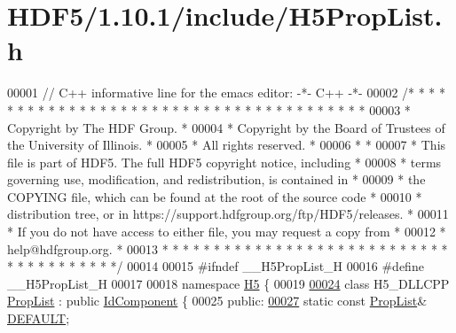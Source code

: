 \hypertarget{_h_d_f5_21_810_81_2include_2_h5_prop_list_8h_source}{}\section{H\+D\+F5/1.10.1/include/\+H5\+Prop\+List.h}
\label{_h_d_f5_21_810_81_2include_2_h5_prop_list_8h_source}

\begin{DoxyCode}
00001 \textcolor{comment}{// C++ informative line for the emacs editor: -*- C++ -*-}
00002 \textcolor{comment}{/* * * * * * * * * * * * * * * * * * * * * * * * * * * * * * * * * * * * * * *}
00003 \textcolor{comment}{ * Copyright by The HDF Group.                                               *}
00004 \textcolor{comment}{ * Copyright by the Board of Trustees of the University of Illinois.         *}
00005 \textcolor{comment}{ * All rights reserved.                                                      *}
00006 \textcolor{comment}{ *                                                                           *}
00007 \textcolor{comment}{ * This file is part of HDF5.  The full HDF5 copyright notice, including     *}
00008 \textcolor{comment}{ * terms governing use, modification, and redistribution, is contained in    *}
00009 \textcolor{comment}{ * the COPYING file, which can be found at the root of the source code       *}
00010 \textcolor{comment}{ * distribution tree, or in https://support.hdfgroup.org/ftp/HDF5/releases.  *}
00011 \textcolor{comment}{ * If you do not have access to either file, you may request a copy from     *}
00012 \textcolor{comment}{ * help@hdfgroup.org.                                                        *}
00013 \textcolor{comment}{ * * * * * * * * * * * * * * * * * * * * * * * * * * * * * * * * * * * * * * */}
00014 
00015 \textcolor{preprocessor}{#ifndef \_\_H5PropList\_H}
00016 \textcolor{preprocessor}{#define \_\_H5PropList\_H}
00017 
00018 \textcolor{keyword}{namespace }\hyperlink{namespace_h5}{H5} \{
00019 
\hyperlink{class_h5_1_1_prop_list}{00024} \textcolor{keyword}{class }H5\_DLLCPP \hyperlink{class_h5_1_1_prop_list}{PropList} : \textcolor{keyword}{public} \hyperlink{class_h5_1_1_id_component}{IdComponent} \{
00025    \textcolor{keyword}{public}:
\hyperlink{class_h5_1_1_prop_list_ae52af66ce82af0ea7e6dc57148c56241}{00027}         \textcolor{keyword}{static} \textcolor{keyword}{const} \hyperlink{class_h5_1_1_prop_list}{PropList}& \hyperlink{class_h5_1_1_prop_list_ae52af66ce82af0ea7e6dc57148c56241}{DEFAULT};

\end{DoxyCode}
